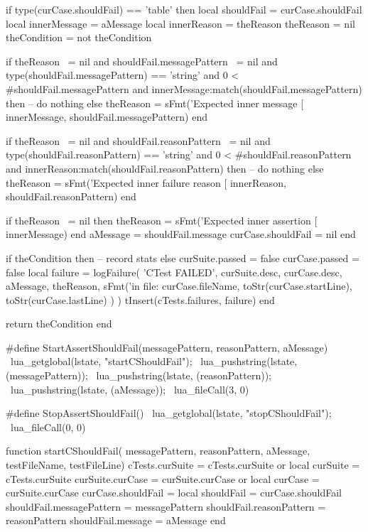   if type(curCase.shouldFail) == 'table' then
    local shouldFail   = curCase.shouldFail
    local innerMessage = aMessage
    local innerReason  = theReason
    theReason          = nil
    theCondition       = not theCondition

    if theReason ~= nil
      and shouldFail.messagePattern ~= nil
      and type(shouldFail.messagePattern) == 'string'
      and 0 < #shouldFail.messagePattern
      and innerMessage:match(shouldFail.messagePattern) then
      -- do nothing
    else
      theReason = sFmt('Expected inner message [%
        innerMessage, shouldFail.messagePattern)
    end

    if theReason ~= nil
      and shouldFail.reasonPattern ~= nil
      and type(shouldFail.reasonPattern) == 'string'
      and 0 < #shouldFail.reasonPattern
      and innerReason:match(shouldFail.reasonPattern) then
      -- do nothing
    else
      theReason = sFmt('Expected inner failure reason [%
        innerReason, shouldFail.reasonPattern)
    end
    
    if theReason ~= nil then
      theReason = sFmt('Expected inner assertion [%
        innerMessage)
    end
    aMessage = shouldFail.message
    curCase.shouldFail = nil
  end
  
  if theCondition then
    -- record stats
  else
    curSuite.passed = false
    curCase.passed  = false
    local failure = logFailure(
      'CTest FAILED',
      curSuite.desc,
      curCase.desc,
      aMessage,
      theReason,
      sFmt('in file: %
        curCase.fileName,
        toStr(curCase.startLine),
        toStr(curCase.lastLine)
      )
    )
    tInsert(cTests.failures, failure)
  end

  return theCondition
end
\stopLuaCode


\startCHeader
#define StartAssertShouldFail(messagePattern, reasonPattern, aMessage) \
  lua_getglobal(lstate, "startCShouldFail");                           \
  lua_pushstring(lstate, (messagePattern));                            \
  lua_pushstring(lstate, (reasonPattern));                             \
  lua_pushstring(lstate, (aMessage));                                  \
  lua_fileCall(3, 0)

#define StopAssertShouldFail()              \
  lua_getglobal(lstate, "stopCShouldFail"); \
  lua_fileCall(0, 0)
\stopCHeader

\startLuaCode
function startCShouldFail(
  messagePattern, reasonPattern, aMessage,
  testFileName, testFileLine)
  cTests.curSuite    = cTests.curSuite or { }
  local curSuite     = cTests.curSuite
  curSuite.curCase   = curSuite.curCase or { }
  local curCase      = curSuite.curCase
  curCase.shouldFail = { }
  local shouldFail   = curCase.shouldFail
  shouldFail.messagePattern = messagePattern
  shouldFail.reasonPattern  = reasonPattern
  shouldFail.message        = aMessage
end

